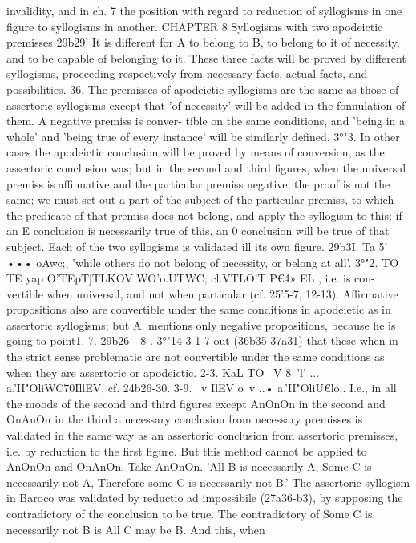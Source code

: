 {invalidity, and in ch. 7 the position with regard to reduction of
syllogisms in one figure to syllogisms in another.
CHAPTER 8
Syllogisms with two apodeictic premisses
29b29' It is different for A to belong to B, to belong to it of
necessity, and to be capable of belonging to it. These three facts
will be proved by different syllogisms, proceeding respectively
from necessary facts, actual facts, and possibilities.
36. The premisses of apodeictic syllogisms are the same as
those of assertoric syllogisms except that 'of necessity' will be
added in the fonnulation of them. A negative premiss is conver-
tible on the same conditions, and 'being in a whole' and 'being
true of every instance' will be similarly defined.
3°"3. In other cases the apodeictic conclusion will be proved
by means of conversion, as the assertoric conclusion was; but in
the second and third figures, when the universal premiss is
affinnative and the particular premiss negative, the proof is not
the same; we must set out a part of the subject of the particular
premiss, to which the predicate of that premiss does not belong,
and apply the syllogism to this; if an E conclusion is necessarily
true of this, an 0 conclusion will be true of that subject. Each
of the two syllogisms is validated ill its own figure.
29b3I. Ta 5' ••• oAwc;, 'while others do not belong of necessity,
or belong at all'.
3°"2. TO TE yap O'TEpT]TLKOV WO'o.UTWC; cl.VTLO'T P€4» EL , i.e. is con-
vertible when universal, and not when particular (cf. 25'5-7,
12-13). Affirmative propositions also are convertible under the
same conditions in apodeietic as in assertoric syllogisms; but A.
mentions only negative propositions, because he is going to point1. 7. 29b26 - 8 . 3°"14
3 1 7
out (36b35-37a31) that these when in the strict sense problematic
are not convertible under the same conditions as when they are
assertoric or apodeictic.
2-3. KaL TO ~V 8~'l' ... a.'II"OliWC70IllEV, cf. 24b26-30.
3-9. ~v IlEV o~v ..• a.'II"OliU€lo;. I.e., in all the moods of the
second and third figures except AnOnOn in the second and OnAnOn
in the third a necessary conclusion from necessary premisses is
validated in the same way as an assertoric conclusion from
assertoric premisses, i.e. by reduction to the first figure. But this
method cannot be applied to AnOnOn and OnAnOn. Take AnOnOn.
'All B is necessarily A, Some C is necessarily not A, Therefore
some C is necessarily not B.' The assertoric syllogism in Baroco
was validated by reductio ad impossibile (27a36-b3), by supposing
the contradictory of the conclusion to be true. The contradictory
of Some C is necessarily not B is All C may be B. And this, when
}
